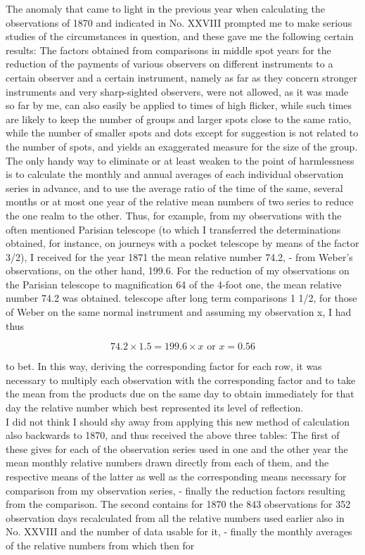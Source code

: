 \documentclass[12pt]{article}
\begin{document}
The anomaly that came to light in the previous year when calculating the observations of 1870 and indicated in No. XXVIII prompted me to make serious studies of the circumstances in question, and these gave me the following certain results: The factors obtained from comparisons in middle spot years for the reduction of the payments of various observers on different instruments to a certain observer and a certain instrument, namely as far as they concern stronger instruments and very sharp-sighted observers, were not allowed, as it was made so far by me, can also easily be applied to times of high flicker, while such times are likely to keep the number of groups and larger spots close to the same ratio, while the number of smaller spots and dots except for suggestion is not related to the number of spots, and yields an exaggerated measure for the size of the group. The only handy way to eliminate or at least weaken to the point of harmlessness is to calculate the monthly and annual averages of each individual observation series in advance, and to use the average ratio of the time of the same, several months or at most one year of the relative mean numbers of two series to reduce the one realm to the other. Thus, for example, from my observations with the often mentioned Parisian telescope (to which I transferred the determinations obtained, for instance, on journeys with a pocket telescope by means of the factor 3/2), I received for the year 1871 the mean relative number 74.2, - from Weber's observations, on the other hand, 199.6. For the reduction of my observations on the Parisian telescope to magnification 64 of the 4-foot one, the mean relative number 74.2 was obtained. 
telescope after long term comparisons 1 1/2, for those of Weber on the same normal instrument and assuming my observation x, I had thus

$$74.2 \times 1.5 = 199.6 \times x \text{ \ or \ } x = 0.56$$

to bet. In this way, deriving the corresponding factor for each row, it was necessary to multiply each observation with the corresponding factor and to take the mean from the products due on the same day to obtain immediately for that day the relative number which best represented its level of reflection.\\

I did not think I should shy away from applying this new method of calculation also backwards to 1870, and thus received the above three tables: The first of these gives for each of the observation series used in one and the other year the mean monthly relative numbers drawn directly from each of them, and the respective means of the latter as well as the corresponding means necessary for comparison from my observation series, - finally the reduction factors resulting from the comparison. The second contains for 1870 the 843 observations for 352 observation days recalculated from all the relative numbers used earlier also in No. XXVIII and the number of data usable for it, - finally the monthly averages of the relative numbers from which then for\\
\end{document}
